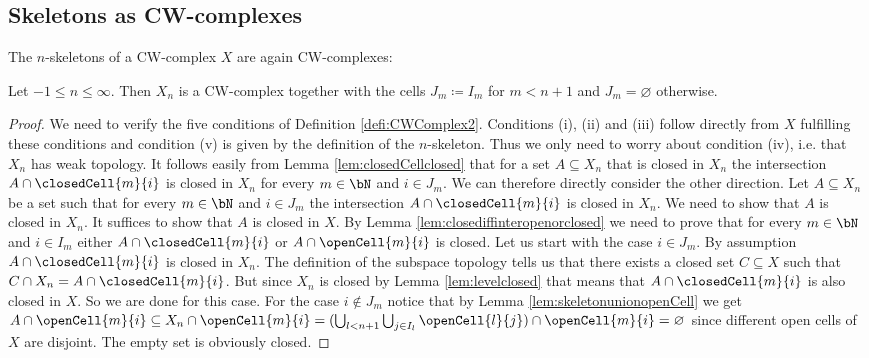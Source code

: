 \subsection{Skeletons as CW-complexes}

The $n$-skeletons of a CW-complex $X$ are again CW-complexes: 

\begin{lem} \label{lem:levelcwcomplex}
    Let $-1 \le n \le \infty$. 
    Then $X_n$ is a CW-complex together with the cells $J_m \coloneq I_m$ for $m < n + 1$ and $J_m = \varnothing$ otherwise.
    \href{https://github.com/scholzhannah/CWComplexes/blob/7be4872a05b534011cc969eb5b80a4b7f0bf57e2/CWcomplexes/Constructions.lean#L66-L67}{\faExternalLink}
\end{lem}
\begin{proof}
    We need to verify the five conditions of Definition \ref{defi:CWComplex2}.
    Conditions (i), (ii) and (iii) follow directly from $X$ fulfilling these conditions and condition (v) is given by the definition of the $n$-skeleton. 
    Thus we only need to worry about condition (iv), i.e. that $X_n$ has weak topology. 
    It follows easily from Lemma \ref{lem:closedCellclosed} that for a set $A \subseteq X_n$ that is closed in $X_n$ the intersection $A \cap \closedCell{m}{i}$ is closed in $X_n$ for every $m \in \bN$ and $i \in J_m$. 
    We can therefore directly consider the other direction. 
    Let $A \subseteq X_n$ be a set such that for every $m \in \bN$ and $i \in J_m$ the intersection $A \cap \closedCell{m}{i}$ is closed in $X_n$. 
    We need to show that $A$ is closed in $X_n$. 
    It suffices to show that $A$ is closed in $X$. 
    By Lemma \ref{lem:closediffinteropenorclosed} we need to prove that for every $m \in \bN$ and $i \in I_m$ either $A \cap \closedCell{m}{i}$ or $A \cap \openCell{m}{i}$ is closed. 
    Let us start with the case $i \in J_m$. 
    By assumption $A \cap \closedCell{m}{i}$ is closed in $X_n$. 
    The definition of the subspace topology tells us that there exists a closed set $C \subseteq X$ such that $C \cap X_n = A \cap \closedCell{m}{i}$. 
    But since $X_n$ is closed by Lemma \ref{lem:levelclosed} that means that $A \cap \closedCell{m}{i}$ is also closed in $X$. 
    So we are done for this case. 
    For the case $i \notin J_m$ notice that by Lemma \ref{lem:skeletonunionopenCell} we get $A \cap \openCell{m}{i} \subseteq X_n \cap \openCell{m}{i} = (\bigcup_{l < n + 1}\bigcup_{j \in I_l}\openCell{l}{j}) \cap \openCell{m}{i} = \varnothing$ since different open cells of $X$ are disjoint. 
    The empty set is obviously closed.
\end{proof}